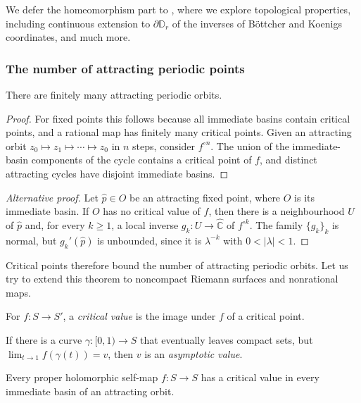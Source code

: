 \documentclass[11pt,a4paper]{article}
\begin{document}
\begin{remark}
We defer the homeomorphism part to , where we explore topological properties, including continuous extension to $\partial\mathbb D_r$ of the inverses of B\"ottcher and Koenigs coordinates, and much more.
\end{remark}
\subsubsection{The number of attracting periodic points}
\setcounter{theorem}{14}\begin{theorem}\label{cd2:finite-attractors}
There are finitely many attracting periodic orbits.
\end{theorem}
\begin{proof}
For fixed points this follows because all immediate basins contain critical points, and a rational map has finitely many critical points. Given an attracting orbit $z_0\mapsto z_1\mapsto\cdots\mapsto z_0$ in $n$ steps, consider $f^{\circ n}$. The union of the immediate-basin components of the cycle contains a critical point of $f$, and distinct attracting cycles have disjoint immediate basins.
\end{proof}
\begin{proof}[Alternative proof]
Let $\widehat p\in O$ be an attracting fixed point, where $O$ is its immediate basin. If $O$ has no critical value of $f$, then there is a neighbourhood $U$ of $\widehat p$ and, for every $k\ge1$, a local inverse $g_k\colon U\to\widehat{\mathbb C}$ of $f^{\circ k}$. The family $\{g_k\}_k$ is normal, but $g_k'(\widehat p)$ is unbounded, since it is $\lambda^{-k}$ with $0<|\lambda|<1$.
\end{proof}
Critical points therefore bound the number of attracting periodic orbits. Let us try to extend this theorem to noncompact Riemann surfaces and nonrational maps.
\setcounter{definition}{8}\begin{definition}
For $f\colon S\to S'$, a \emph{critical value} is the image under $f$ of a critical point.
\end{definition}
\setcounter{definition}{9}\begin{definition}
If there is a curve $\gamma\colon[0,1)\to S$ that eventually leaves compact sets, but $\lim_{t\to1}f(\gamma(t))=v$, then $v$ is an \emph{asymptotic value}.
\end{definition}
\setcounter{theorem}{15}\begin{theorem}
Every proper holomorphic self-map $f\colon S\to S$ has a critical value in every immediate basin of an attracting orbit.
\end{theorem}
\end{document}
